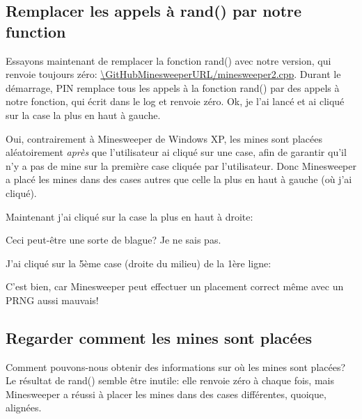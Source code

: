 \subsection{Remplacer les appels à rand() par notre function}

Essayons maintenant de remplacer la fonction rand() avec notre version, qui renvoie
toujours zéro: \url{\GitHubMinesweeperURL/minesweeper2.cpp}.
Durant le démarrage, PIN remplace tous les appels à la fonction rand() par des appels
à notre fonction, qui écrit dans le log et renvoie zéro.
Ok, je l'ai lancé et ai cliqué sur la case la plus en haut à gauche.

\begin{figure}[H]
\centering
{}
\end{figure}

Oui, contrairement à Minesweeper de Windows XP, les mines sont placées aléatoirement
\emph{après} que l'utilisateur ai cliqué sur une case, afin de garantir qu'il n'y
a pas de mine sur la première case cliquée par l'utilisateur.
Donc Minesweeper a placé les mines dans des cases autres que celle la plus en
haut à gauche (où j'ai cliqué).

Maintenant j'ai cliqué sur la case la plus en haut à droite:

\begin{figure}[H]
\centering
{}
\end{figure}

Ceci peut-être une sorte de blague? Je ne sais pas.

J'ai cliqué sur la 5ème case (droite du milieu) de la 1ère ligne:

\begin{figure}[H]
\centering
{}
\end{figure}

C'est bien, car Minesweeper peut effectuer un placement correct même avec un \ac{PRNG}
aussi mauvais!

\subsection{Regarder comment les mines sont placées}

Comment pouvons-nous obtenir des informations sur où les mines sont placées?
Le résultat de rand() semble être inutile: elle renvoie zéro à chaque fois, mais
Minesweeper a réussi à placer les mines dans des cases différentes, quoique, alignées.

